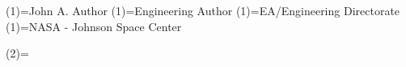 \docAuthorName(1)={John A. Author}
\docAuthorPosition(1)={Engineering Author}
\docAuthorOrganization(1)={EA/Engineering Directorate}
\docAuthorLocation(1)={NASA - Johnson Space Center}

\docAuthorName(2)={}
